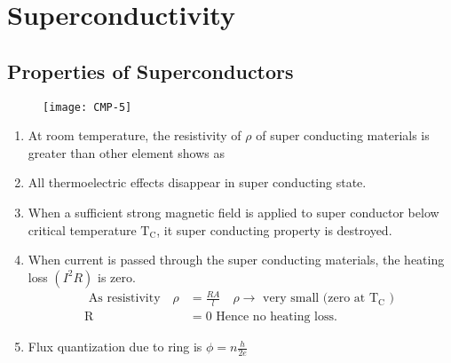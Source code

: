 \section{Superconductivity}
\subsection{Properties of Superconductors}
\begin{figure}[H]
	\centering
	\texttt{[image: CMP-5]}
	\caption{}
	\label{}
\end{figure}
\begin{enumerate}
	\item At room temperature, the resistivity of $\rho$ of super conducting materials is greater than other element shows as
	\item All thermoelectric effects disappear in super conducting state.
	\item  When a sufficient strong magnetic field is applied to super conductor below critical temperature $\mathrm{T}_{\mathrm{C}}$, it super conducting property is destroyed.
	\item When current is passed through the super conducting materials, the heating loss $\left(I^{2} R\right)$ is zero.
	\begin{align*}
		\text{	As resistivity}\quad \rho&=\frac{R A}{l} \quad \rho \rightarrow \text { very small (zero at } \mathrm{T}_{\mathrm{C}} \text { ) }\\
		\mathrm{R}&=0 \text { Hence no heating loss. }
	\end{align*}
	\item Flux quantization due to ring is $\phi=n \frac{h}{2 e}$
\end{enumerate}
